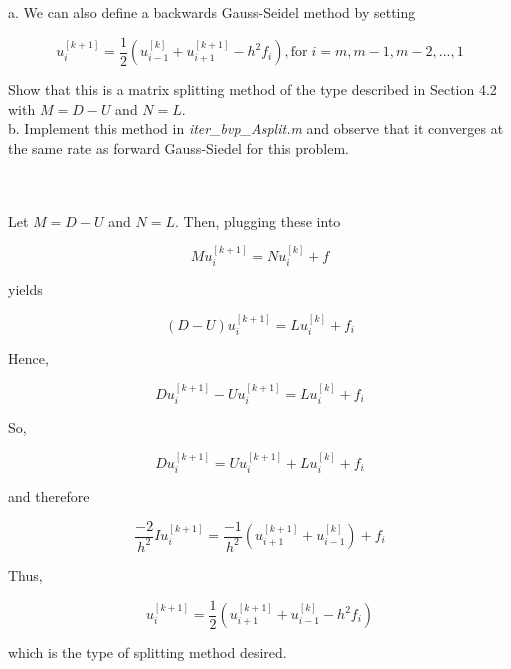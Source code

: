 a. We can also define a backwards Gauss-Seidel method by setting

$$u^{[k+1]}_i=\frac12(u^{[k]}_{i-1}+u^{[k+1]}_{i+1}-h^2f_i), \text{for}\; i=m, m-1, m-2, . . . , 1$$

Show that this is a matrix splitting method of the type described in Section 4.2 with $M=D-U$ and
$N=L$.\\
b. Implement this method in \textit{iter\_bvp\_Asplit.m} and observe that it converges at the same rate
as forward Gauss-Siedel for this problem.\\\\

\begin{solution}\renewcommand{\qedsymbol}{}\ \\
    Let $M=D-U$ and $N=L$. Then, plugging these into
    
    $$Mu^{[k+1]}_i=Nu^{[k]}_i+f$$
    
    yields
    
    $$(D-U)u^{[k+1]}_i=Lu^{[k]}_i+f_i$$
    
    Hence,
    
    $$Du^{[k+1]}_i-Uu^{[k+1]}_i=Lu^{[k]}_i+f_i$$
    
    So,
    
    $$Du^{[k+1]}_i=Uu^{[k+1]}_i+Lu^{[k]}_i+f_i$$
    
    and therefore
    
    $$\frac{-2}{h^2}Iu^{[k+1]}_i=\frac{-1}{h^2}(u^{[k+1]}_{i+1}+u^{[k]}_{i-1})+f_i$$
    
    Thus,
    
    $$u^{[k+1]}_i=\frac12(u^{[k+1]}_{i+1}+u^{[k]}_{i-1}-h^2f_i)$$
    
    which is the type of splitting method desired.\\


\end{solution}
